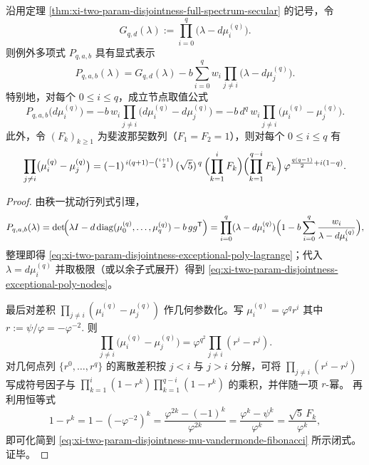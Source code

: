 \begin{theorem}[例外多项式的拉格朗日型闭式与节点差积的斐波那契乘积]\label{thm:xi-two-param-disjointness-exceptional-poly-nodes}
沿用定理 \ref{thm:xi-two-param-disjointness-full-spectrum-secular} 的记号，令
\[
G_{q,d}(\lambda):=\prod_{i=0}^q\bigl(\lambda-d\mu_i^{(q)}\bigr).
\]
则例外多项式 \(P_{q,a,b}\) 具有显式表示
\begin{equation}\label{eq:xi-two-param-disjointness-exceptional-poly-lagrange}
P_{q,a,b}(\lambda)=G_{q,d}(\lambda)-b\sum_{i=0}^q w_i\prod_{j\ne i}\bigl(\lambda-d\mu_j^{(q)}\bigr).
\end{equation}
特别地，对每个 \(0\le i\le q\)，成立节点取值公式
\begin{equation}\label{eq:xi-two-param-disjointness-exceptional-poly-nodes}
P_{q,a,b}\bigl(d\mu_i^{(q)}\bigr)
=-b\,w_i\prod_{j\ne i}\bigl(d\mu_i^{(q)}-d\mu_j^{(q)}\bigr)
=-b\,d^{q}\,w_i\prod_{j\ne i}\bigl(\mu_i^{(q)}-\mu_j^{(q)}\bigr).
\end{equation}
此外，令 \((F_k)_{k\ge 1}\) 为斐波那契数列（\(F_1=F_2=1\)），则对每个 \(0\le i\le q\) 有
\begin{equation}\label{eq:xi-two-param-disjointness-mu-vandermonde-fibonacci}
\prod_{j\ne i}\bigl(\mu_i^{(q)}-\mu_j^{(q)}\bigr)
=(-1)^{\,i(q+1)-\binom{i+1}{2}}\,
(\sqrt5)^{\,q}\,
\Bigl(\prod_{k=1}^{i}F_k\Bigr)\Bigl(\prod_{k=1}^{q-i}F_k\Bigr)\,
\varphi^{\frac{q(q-1)}{2}+i(1-q)}.
\end{equation}
\end{theorem}
\begin{proof}
由秩一扰动行列式引理，
\[
P_{q,a,b}(\lambda)
=\det\!\Bigl(\lambda I-d\,\mathrm{diag}(\mu_0^{(q)},\dots,\mu_q^{(q)})-b\,gg^{\mathsf T}\Bigr)
=\prod_{i=0}^q(\lambda-d\mu_i^{(q)})\Bigl(1-b\sum_{i=0}^q\frac{w_i}{\lambda-d\mu_i^{(q)}}\Bigr),
\]
整理即得 \eqref{eq:xi-two-param-disjointness-exceptional-poly-lagrange}；代入 \(\lambda=d\mu_i^{(q)}\) 并取极限（或以余子式展开）得到 \eqref{eq:xi-two-param-disjointness-exceptional-poly-nodes}。
\par
最后对差积 \(\prod_{j\ne i}(\mu_i^{(q)}-\mu_j^{(q)})\) 作几何参数化。写
\(
\mu_i^{(q)}=\varphi^q r^i
\)
其中
\(
r:=\psi/\varphi=-\varphi^{-2}.
\)
则
\[
\prod_{j\ne i}\bigl(\mu_i^{(q)}-\mu_j^{(q)}\bigr)
=\varphi^{q^2}\prod_{j\ne i}(r^i-r^j).
\]
对几何点列 \(\{r^0,\dots,r^q\}\) 的离散差积按 \(j<i\) 与 \(j>i\) 分解，可将 \(\prod_{j\ne i}(r^i-r^j)\) 写成符号因子与
\(
\prod_{k=1}^{i}(1-r^k)\prod_{k=1}^{q-i}(1-r^k)
\)
的乘积，并伴随一项 \(r\)-幂。
再利用恒等式
\[
1-r^k
=1-(-\varphi^{-2})^k
=\frac{\varphi^{2k}-(-1)^k}{\varphi^{2k}}
=\frac{\varphi^k-\psi^k}{\varphi^k}
=\frac{\sqrt5\,F_k}{\varphi^k},
\]
即可化简到 \eqref{eq:xi-two-param-disjointness-mu-vandermonde-fibonacci} 所示闭式。证毕。
\end{proof}

